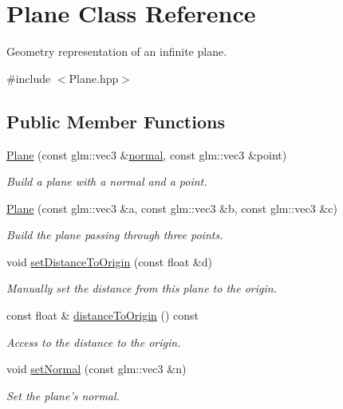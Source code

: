 \hypertarget{classPlane}{\section{Plane Class Reference}
\label{classPlane}
}


Geometry representation of an infinite plane.  




{\ttfamily \#include $<$Plane.\+hpp$>$}

\subsection*{Public Member Functions}
\begin{DoxyCompactItemize}
\item 
\hyperlink{classPlane_ab0a2674b0b2a14afaf71c34392e5d374}{Plane} (const glm\+::vec3 \&\hyperlink{classPlane_afea6480f0bbab2a9ef0c74bd7af5d595}{normal}, const glm\+::vec3 \&point)
\begin{DoxyCompactList}\small\item\em Build a plane with a normal and a point. \end{DoxyCompactList}\item 
\hyperlink{classPlane_adccfb4ea49813a45fd883438af858495}{Plane} (const glm\+::vec3 \&a, const glm\+::vec3 \&b, const glm\+::vec3 \&c)
\begin{DoxyCompactList}\small\item\em Build the plane passing through three points. \end{DoxyCompactList}\item 
void \hyperlink{classPlane_aa299ec4054d6735e8f2fffde2a38b434}{set\+Distance\+To\+Origin} (const float \&d)
\begin{DoxyCompactList}\small\item\em Manually set the distance from this plane to the origin. \end{DoxyCompactList}\item 
const float \& \hyperlink{classPlane_aeec90982ee9dd4a1d47d3570374ffbc0}{distance\+To\+Origin} () const 
\begin{DoxyCompactList}\small\item\em Access to the distance to the origin. \end{DoxyCompactList}\item 
void \hyperlink{classPlane_a1cddc7028e96d68a176fb742ab1e349d}{set\+Normal} (const glm\+::vec3 \&n)
\begin{DoxyCompactList}\small\item\em Set the plane's normal. \end{DoxyCompactList}\item 

\end{DoxyCompactItemize}
